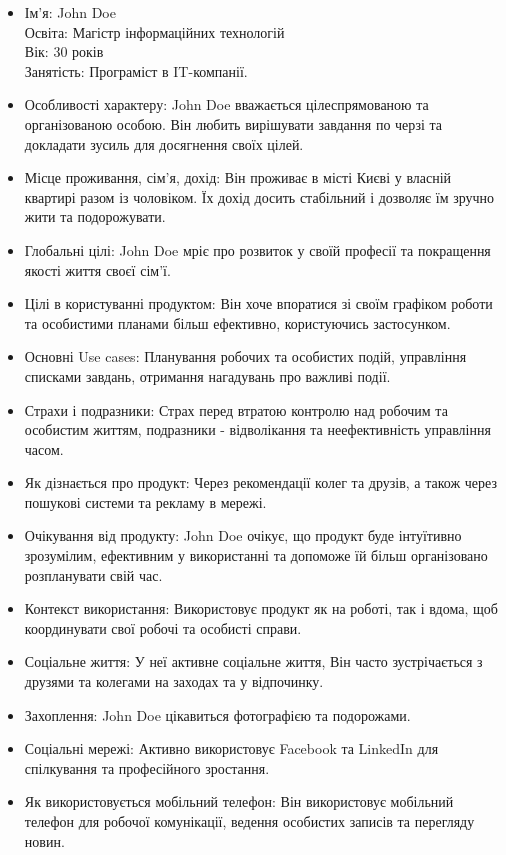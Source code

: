 \documentclass[oneside,14pt]{extarticle}
\begin{document}
\begin{normalsize}
	\begin{itemize}
		\item Ім’я: John Doe\\
		Освіта: Магістр інформаційних технологій\\
		Вік: 30 років\\
		Занятість: Програміст в IT-компанії.
		\item Особливості характеру: John Doe вважається цілеспрямованою та організованою особою. Він любить вирішувати завдання по черзі та докладати зусиль для досягнення своїх цілей.
		\item Місце проживання, сім’я, дохід: Він проживає в місті Києві у власній квартирі разом із чоловіком. Їх дохід досить стабільний і дозволяє їм зручно жити та подорожувати.
		\item Глобальні цілі: John Doe мріє про розвиток у своїй професії та покращення якості життя своєї сім'ї.
		\item Цілі в користуванні продуктом: Він хоче впоратися зі своїм графіком роботи та особистими планами більш ефективно, користуючись застосунком.
		\item Основні Use cases: Планування робочих та особистих подій, управління списками завдань, отримання нагадувань про важливі події.
		\item Страхи і подразники: Страх перед втратою контролю над робочим та особистим життям, подразники - відволікання та неефективність управління часом.
		\item Як дізнається про продукт: Через рекомендації колег та друзів, а також через пошукові системи та рекламу в мережі.
		\item Очікування від продукту: John Doe очікує, що продукт буде інтуїтивно зрозумілим, ефективним у використанні та допоможе їй більш організовано розпланувати свій час.
		\item Контекст використання: Використовує продукт як на роботі, так і вдома, щоб координувати свої робочі та особисті справи.
		\item Соціальне життя: У неї активне соціальне життя, Він часто зустрічається з друзями та колегами на заходах та у відпочинку.
		\item Захоплення: John Doe цікавиться фотографією та подорожами.
		\item Соціальні мережі: Активно використовує Facebook та LinkedIn для спілкування та професійного зростання.
		\item Як використовується мобільний телефон: Він використовує мобільний телефон для робочої комунікації, ведення особистих записів та перегляду новин.
	\end{itemize}
	

\end{normalsize}
\end{document}

